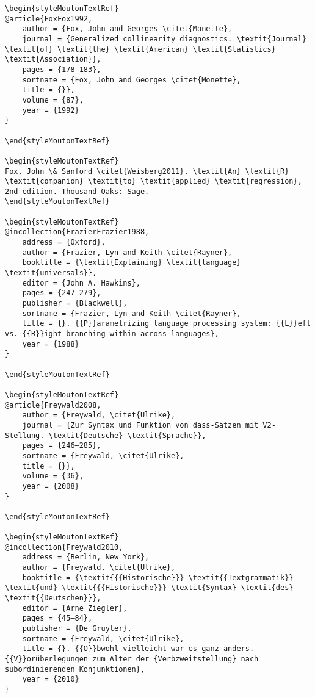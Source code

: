 \begin{styleMoutonHeadingRef}
\begin{verbatim}
\begin{styleMoutonTextRef}
@article{FoxFox1992,
	author = {Fox, John and Georges \citet{Monette},
	journal = {Generalized collinearity diagnostics. \textit{Journal} \textit{of} \textit{the} \textit{American} \textit{Statistics} \textit{Association}},
	pages = {178–183},
	sortname = {Fox, John and Georges \citet{Monette},
	title = {}},
	volume = {87},
	year = {1992}
}

\end{styleMoutonTextRef}

\begin{styleMoutonTextRef}
Fox, John \& Sanford \citet{Weisberg2011}. \textit{An} \textit{R} \textit{companion} \textit{to} \textit{applied} \textit{regression}, 2nd edition. Thousand Oaks: Sage.
\end{styleMoutonTextRef}

\begin{styleMoutonTextRef}
@incollection{FrazierFrazier1988,
	address = {Oxford},
	author = {Frazier, Lyn and Keith \citet{Rayner},
	booktitle = {\textit{Explaining} \textit{language} \textit{universals}},
	editor = {John A. Hawkins},
	pages = {247–279},
	publisher = {Blackwell},
	sortname = {Frazier, Lyn and Keith \citet{Rayner},
	title = {}. {{P}}arametrizing language processing system: {{L}}eft vs. {{R}}ight-branching within across languages},
	year = {1988}
}

\end{styleMoutonTextRef}

\begin{styleMoutonTextRef}
@article{Freywald2008,
	author = {Freywald, \citet{Ulrike},
	journal = {Zur Syntax und Funktion von dass-Sätzen mit V2-Stellung. \textit{Deutsche} \textit{Sprache}},
	pages = {246–285},
	sortname = {Freywald, \citet{Ulrike},
	title = {}},
	volume = {36},
	year = {2008}
}

\end{styleMoutonTextRef}

\begin{styleMoutonTextRef}
@incollection{Freywald2010,
	address = {Berlin, New York},
	author = {Freywald, \citet{Ulrike},
	booktitle = {\textit{{{Historische}}} \textit{{Textgrammatik}} \textit{und} \textit{{{Historische}}} \textit{Syntax} \textit{des} \textit{{Deutschen}}},
	editor = {Arne Ziegler},
	pages = {45–84},
	publisher = {De Gruyter},
	sortname = {Freywald, \citet{Ulrike},
	title = {}. {{O}}bwohl vielleicht war es ganz anders. {{V}}orüberlegungen zum Alter der {Verbzweitstellung} nach subordinierenden Konjunktionen},
	year = {2010}
}


\end{verbatim}
\end{styleMoutonHeadingRef}
